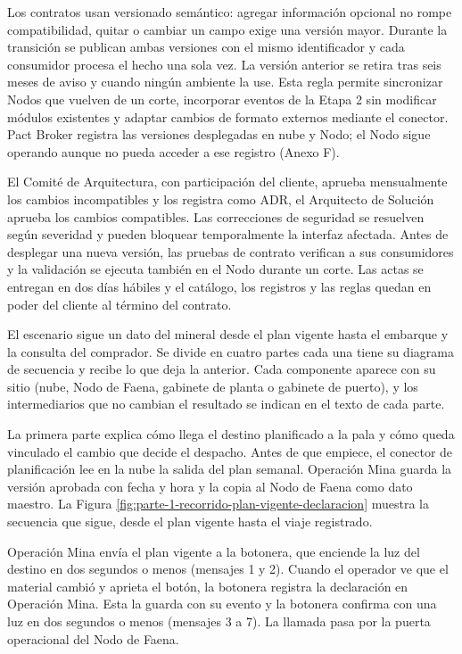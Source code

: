 \documentclass[subdoc]{../../comun/overfore}
\begin{document}
Los contratos usan versionado semántico: agregar información opcional no rompe compatibilidad, quitar o cambiar un campo exige una versión mayor. Durante la transición se publican ambas versiones con el mismo identificador y cada consumidor procesa el hecho una sola vez. La versión anterior se retira tras seis meses de aviso y cuando ningún ambiente la use. Esta regla permite sincronizar Nodos que vuelven de un corte, incorporar eventos de la Etapa 2 sin modificar módulos existentes y adaptar cambios de formato externos mediante el conector. Pact Broker registra las versiones desplegadas en nube y Nodo; el Nodo sigue operando aunque no pueda acceder a ese registro (Anexo F).

El Comité de Arquitectura, con participación del cliente, aprueba mensualmente los cambios incompatibles y los registra como ADR, el Arquitecto de Solución aprueba los cambios compatibles. Las correcciones de seguridad se resuelven según severidad y pueden bloquear temporalmente la interfaz afectada. Antes de desplegar una nueva versión, las pruebas de contrato verifican a sus consumidores y la validación se ejecuta también en el Nodo durante un corte. Las actas se entregan en dos días hábiles y el catálogo, los registros y las reglas quedan en poder del cliente al término del contrato.

El escenario sigue un dato del mineral desde el plan vigente hasta el embarque y la consulta del comprador. Se divide en cuatro partes cada una tiene su diagrama de secuencia y recibe lo que deja la anterior. Cada componente aparece con su sitio (nube, Nodo de Faena, gabinete de planta o gabinete de puerto), y los intermediarios que no cambian el resultado se indican en el texto de cada parte.

La primera parte explica cómo llega el destino planificado a la pala y cómo queda vinculado el cambio que decide el despacho. Antes de que empiece, el conector de planificación lee en la nube la salida del plan semanal. Operación Mina guarda la versión aprobada con fecha y hora y la copia al Nodo de Faena como dato maestro. La Figura \ref{fig:parte-1-recorrido-plan-vigente-declaracion} muestra la secuencia que sigue, desde el plan vigente hasta el viaje registrado.

Operación Mina envía el plan vigente a la botonera, que enciende la luz del destino en dos segundos o menos (mensajes 1 y 2). Cuando el operador ve que el material cambió y aprieta el botón, la botonera registra la declaración en Operación Mina. Esta la guarda con su evento y la botonera confirma con una luz en dos segundos o menos (mensajes 3 a 7). La llamada pasa por la puerta operacional del Nodo de Faena.
\end{document}

